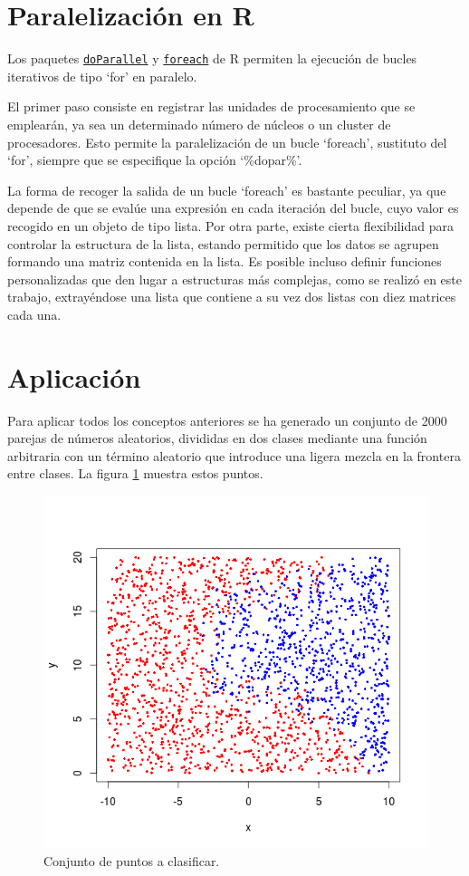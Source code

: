\documentclass[12pt]{scrartcl}
\begin{document}
\section{Paralelización en R}
Los paquetes \href{http://cran.r-project.org/web/packages/doParallel/index.html}{\texttt{doParallel}} y \href{http://cran.r-project.org/web/packages/foreach/index.html}{\texttt{foreach}} de R permiten la ejecución de bucles iterativos de tipo `for' en paralelo.\par
El primer paso consiste en registrar las unidades de procesamiento que se emplearán, ya sea un determinado número de núcleos o un cluster de procesadores. Esto permite la paralelización de un bucle `foreach', sustituto del `for', siempre que se especifique la opción `\%dopar\%'.\par
La forma de recoger la salida de un bucle `foreach' es bastante peculiar, ya que depende de que se evalúe una expresión en cada iteración del bucle, cuyo valor es recogido en un objeto de tipo lista. Por otra parte, existe cierta flexibilidad para controlar la estructura de la lista, estando permitido que los datos se agrupen formando una matriz contenida en la lista. Es posible incluso definir funciones personalizadas que den lugar a estructuras más complejas, como se realizó en este trabajo, extrayéndose una lista que contiene a su vez dos listas con diez matrices cada una.\par

\section{Aplicación}
Para aplicar todos los conceptos anteriores se ha generado un conjunto de 2000 parejas de números aleatorios, divididas en dos clases mediante una función arbitraria con un término aleatorio que introduce una ligera mezcla en la frontera entre clases. La figura \ref{fig:puntos} muestra estos puntos.\par

\begin{figure}[]
\centering
\includegraphics [width=10 cm]{points}
\caption{Conjunto de puntos a clasificar.}
\label{fig:puntos}
\end{figure}
\end{document}
